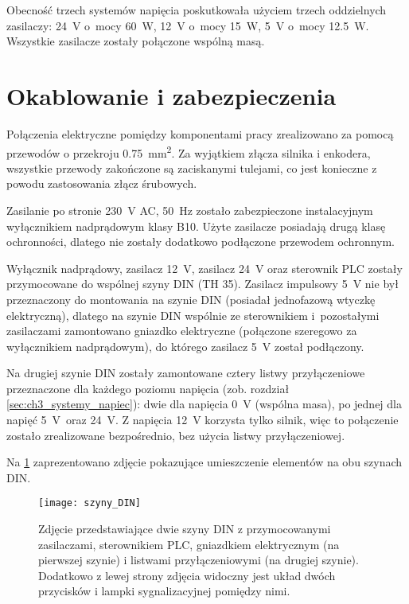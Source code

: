 Obecność trzech systemów napięcia poskutkowała użyciem trzech oddzielnych zasilaczy: \SI{24}{\volt} o~mocy \SI{60}{\watt}, \SI{12}{\volt} o~mocy \SI{15}{\watt}, \SI{5}{\volt} o~mocy \SI{12,5}{\watt}. Wszystkie zasilacze zostały połączone wspólną masą.

\section{Okablowanie i zabezpieczenia}
\label{sec:ch3_okablowanie_zabezpieczenia}

Połączenia elektryczne pomiędzy komponentami pracy zrealizowano za pomocą przewodów o przekroju \SI{0,75}{\milli\meter\squared}. Za wyjątkiem złącza silnika i enkodera, wszystkie przewody zakończone są zaciskanymi tulejami, co jest konieczne z powodu zastosowania złącz śrubowych.

Zasilanie po stronie \SI{230}{\volt} AC, \SI{50}{\hertz} zostało zabezpieczone instalacyjnym wyłącznikiem nadprądowym klasy B10. Użyte zasilacze posiadają drugą klasę ochronności, dlatego nie zostały dodatkowo podłączone przewodem ochronnym.

Wyłącznik nadprądowy, zasilacz \SI{12}{\volt}, zasilacz \SI{24}{\volt} oraz sterownik PLC zostały przymocowane do wspólnej szyny DIN (TH \num{35}). Zasilacz impulsowy \SI{5}{\volt} nie był przeznaczony do montowania na szynie DIN (posiadał jednofazową wtyczkę elektryczną), dlatego na szynie DIN wspólnie ze sterownikiem i~pozostałymi zasilaczami zamontowano gniazdko elektryczne (połączone szeregowo za wyłącznikiem nadprądowym), do którego zasilacz \SI{5}{\volt} został podłączony.

Na drugiej szynie DIN zostały zamontowane cztery listwy przyłączeniowe przeznaczone dla każdego poziomu napięcia (zob. rozdział \ref{sec:ch3_systemy_napiec}): dwie dla napięcia \SI{0}{\volt} (wspólna masa), po jednej dla napięć \SI{5}{\volt}~oraz \SI{24}{\volt}. Z napięcia \SI{12}{\volt} korzysta tylko silnik, więc to połączenie zostało zrealizowane bezpośrednio, bez użycia listwy przyłączeniowej.

Na \cref{fig:szyny_DIN} zaprezentowano zdjęcie pokazujące umieszczenie elementów na obu szynach DIN.

\begin{figure}
    \centering
    \texttt{[image: szyny\_DIN]}
    \caption{Zdjęcie przedstawiające dwie szyny DIN z przymocowanymi zasilaczami, sterownikiem PLC, gniazdkiem elektrycznym (na pierwszej szynie) i listwami przyłączeniowymi (na drugiej szynie). Dodatkowo z lewej strony zdjęcia widoczny jest układ dwóch przycisków i lampki sygnalizacyjnej pomiędzy nimi.}
    \label{fig:szyny_DIN}
\end{figure}


